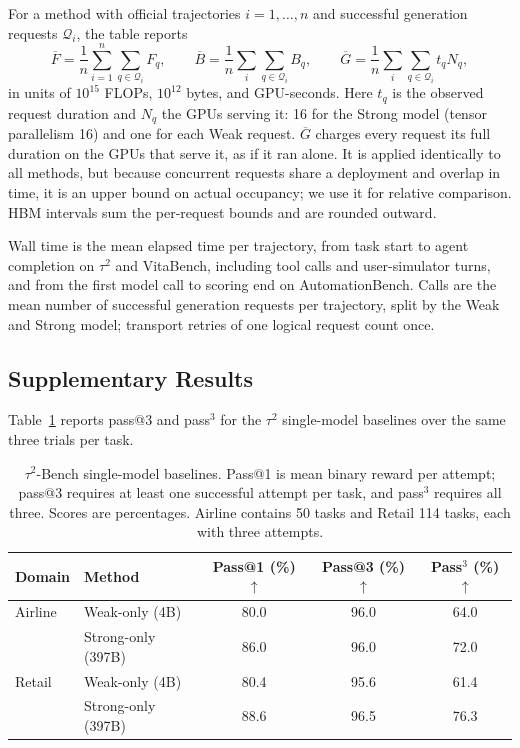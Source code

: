 \documentclass[11pt, copyright, logo, secondlogo]{template/lark}
\begin{document}
For a method with official trajectories $i=1,\ldots,n$ and successful
generation requests $\mathcal Q_i$, the table reports
\begin{equation}
\overline F=\frac{1}{n}\sum_{i=1}^{n}\sum_{q\in\mathcal Q_i}F_q,\qquad
\overline B=\frac{1}{n}\sum_{i}\sum_{q\in\mathcal Q_i}B_q,\qquad
\overline G=\frac{1}{n}\sum_{i}\sum_{q\in\mathcal Q_i}t_qN_q,
\label{eq:resource_ledger}
\end{equation}
in units of $10^{15}$ FLOPs, $10^{12}$ bytes, and GPU-seconds. Here $t_q$ is
the observed request duration and $N_q$ the GPUs serving it: 16 for the
Strong model (tensor parallelism 16) and one for each Weak request.
$\overline G$ charges every request its full duration on the GPUs that
serve it, as if it ran alone. It is applied identically to all methods, but
because concurrent requests share a deployment and overlap in time, it is an
upper bound on actual occupancy; we use it for relative comparison.
\label{eq:gpu_seconds}
HBM intervals sum the per-request
bounds and are rounded outward.

Wall time is the mean elapsed time per trajectory, from task start to agent
completion on $\tau^2$ and VitaBench, including tool calls and user-simulator turns, and
from the first model call to scoring end on AutomationBench. Calls are the
mean number of successful generation requests per trajectory, split by the
Weak and Strong model; transport retries of one logical request count once.

\subsection{Supplementary Results}

Table~\ref{tab:tau2_solo_quality_n3} reports pass@3 and pass$^3$ for the
$\tau^2$ single-model baselines over the same three trials per task.
%
%
%
\begin{table}[H]
\caption{$\tau^2$-Bench single-model baselines. Pass@1 is mean binary reward
per attempt; pass@3 requires at least one successful attempt per task, and
pass$^3$ requires all three. Scores are percentages. Airline contains 50
tasks and Retail 114 tasks, each with three attempts.}
\label{tab:tau2_solo_quality_n3}
\centering
\small
\begin{tabular}{llccc}
\toprule
Domain & Method & Pass@1 (\%) $\uparrow$ & Pass@3 (\%) $\uparrow$ & Pass$^3$ (\%) $\uparrow$ \\
\midrule
Airline & Weak-only (4B) & 80.0 & 96.0 & 64.0 \\
        & Strong-only (397B) & 86.0 & 96.0 & 72.0 \\
\midrule
Retail  & Weak-only (4B) & 80.4 & 95.6 & 61.4 \\
        & Strong-only (397B) & 88.6 & 96.5 & 76.3 \\
\bottomrule
\end{tabular}
\end{table}
 
\end{document}
